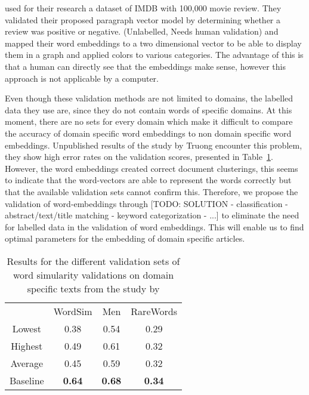 \documentclass[../../Thesis.tex]{subfiles}
\begin{document}
\begin{jumpin}
\citet{le2014distributed} used for their research a dataset of IMDB with 100,000 movie review. They validated their proposed paragraph vector model by determining whether a review was positive or negative.
(Unlabelled, Needs human validation)\citet{dai2015document} and \citet{hinton2003stochastic} mapped their word embeddings to a two dimensional vector to be able to display them in a graph and applied colors to various categories. The advantage of this is that a human can directly see that the embeddings make sense, however this approach is not applicable by a computer.\\
\end{jumpin}
Even though these validation methods are not limited to domains, the labelled data they use are, since they do not contain words of specific domains. At this moment, there are no sets for every domain which make it difficult to compare the accuracy of domain specific word embeddings to non domain specific word embeddings.
Unpublished results of the study by Truong encounter this problem, they show high error rates on the validation scores, presented in Table~\ref{table:truongErrorRates}. However, the word embeddings created correct document clusterings\cite{Truong2017Thesis}, this seems to indicate that the word-vectors are able to represent the words correctly but that the available validation sets cannot confirm this. Therefore, we propose the validation of word-embeddings through [TODO: SOLUTION - classification - abstract/text/title matching - keyword categorization - ...] to eliminate the need for labelled data in the validation of word embeddings. This will enable us to find optimal parameters for the embedding of domain specific articles.
\begin{table}
\begin{center}
\begin{tabular}{c c c c}
&WordSim & Men & RareWords\\
Lowest & 0.38 & 0.54 & 0.29 \\
Highest & 0.49 & 0.61 & 0.32\\
Average & 0.45 & 0.59 & 0.32\\
Baseline & \textbf{0.64} & \textbf{0.68} & \textbf{0.34}
\end{tabular}
\end{center}
\caption{Results for the different validation sets of word simularity validations on domain specific texts from the study by \citet{Truong2017Thesis}}\label{table:truongErrorRates}
\end{table}
\end{document}
